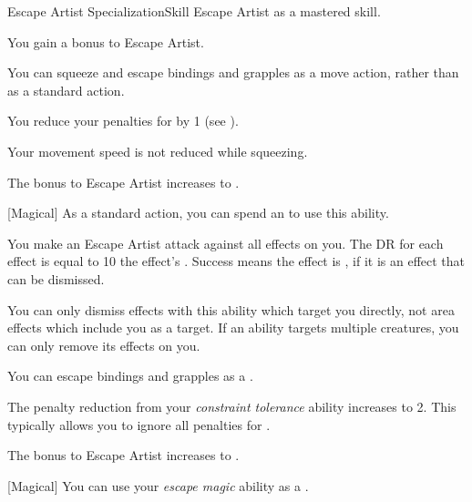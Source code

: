     \begin{feat}{Escape Artist Specialization}{Skill}
        \featpre Escape Artist as a mastered skill.
        \featben

         You gain a  bonus to Escape Artist.

         You can squeeze and escape bindings and grapples as a move action, rather than as a standard action.

         You reduce your penalties for  by 1 (see ).

         Your movement speed is not reduced while squeezing.

         The bonus to Escape Artist increases to .

        [Magical] As a standard action, you can spend an  to use this ability.
        \begin{ability}
            \begin{spelleffects}
                \spelleffect You make an Escape Artist attack against all  effects on you.
                The DR for each effect is equal to 10 \add the effect's .
                Success means the effect is , if it is an effect that can be dismissed.
                \par You can only dismiss effects with this ability which target you directly, not area effects which include you as a target.
                If an ability targets multiple creatures, you can only remove its effects on you.
            \end{spelleffects}
        \end{ability}

         You can escape bindings and grapples as a .

         The penalty reduction from your \textit{constraint tolerance} ability increases to 2.
        This typically allows you to ignore all penalties for .

         The bonus to Escape Artist increases to .

        [Magical] You can use your \textit{escape magic} ability as a .
    \end{feat}

